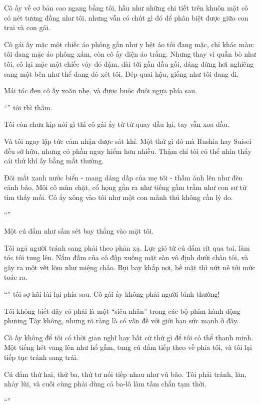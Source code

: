 \documentclass[../main.tex]{subfiles}
\begin{document}
Cô ấy về cơ bản cao ngang bằng tôi, hầu như những chi tiết trên khuôn mặt cô có nét tương đồng như tôi, nhưng vẫn có chút gì đó để phân biệt được giữa con trai và con gái.

Cô gái ấy mặc một chiếc áo phông gần như y hệt áo tôi đang mặc, chỉ khác màu: tôi đang mặc áo phông xám, còn cô ấy diện áo trắng. Nhưng thay vì quần bò như tôi, cô lại mặc một chiếc váy đỏ đậm, dài tới gần đầu gối, dáng đứng hơi nghiêng sang một bên như thể đang dò xét tôi. Dép quai hậu, giống như tôi đang đi.

Mái tóc đen cô ấy xoăn nhẹ, và được buộc đuôi ngựa phía sau.

``'' tôi thì thầm.

Tôi còn chưa kịp nói gì thì cô gái ấy từ từ quay đầu lại, tay vẫn xoa đầu.

Và tôi ngay lập tức cảm nhận được sát khí. Một thứ gì đó mà Rushia hay Suisei đều sở hữu, nhưng có phần nguy hiểm hơn nhiều. Thậm chí tôi có thể nhìn thấy cái thứ khí ấy bằng mắt thường.

Đôi mắt xanh nước biển - mang dáng dấp của mẹ tôi - thẫm ánh lên như đèn cảnh báo. Môi cô mím chặt, cổ họng gằn ra như tiếng gầm trầm như con sư tử tìm thấy mồi. Cô ấy xông vào tôi như một con mãnh thú không cần lý do.

``''

Một cú đấm như sấm sét bay thẳng vào mặt tôi.

Tôi ngả người tránh sang phải theo phản xạ. Lực gió từ cú đấm rít qua tai, làm tóc tôi tung lên. Nắm đấm của cô đập xuống mặt sàn vô định dưới chân tôi, và gây ra một vết lõm như miệng chảo. Bụi bay khắp nơi, bề mặt thì nứt nẻ tới mức toác ra.

``'' tôi sợ hãi lùi lại phía sau. Cô gái ấy không phải người bình thường!

Tôi không biết đây có phải là một ``siêu nhân'' trong các bộ phim hành động phương Tây không, nhưng rõ ràng là có vấn đề với giới hạn sức mạnh ở đây.

Cô ấy không để tôi có thời gian nghĩ hay bất cứ thứ gì để tôi có thể thanh minh. Một tiếng hét vang lên như hổ gầm, tung cú đấm tiếp theo về phía tôi, và tôi lại tiếp tục tránh sang trái.

Cú đấm thứ hai, thứ ba, thứ tư nối tiếp nhau như vũ bão. Tôi phải tránh, lăn, nhảy lùi, và cuối cùng phải dùng cả ba-lô làm tấm chắn tạm thời.

``''
\end{document}
